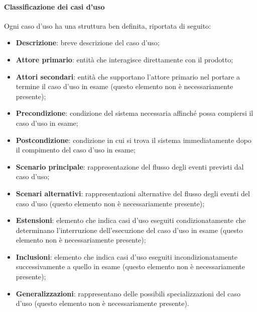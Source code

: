 \paragraph{Classificazione dei casi d'uso}
\label{par:classificazione_casi_duso}

Ogni caso d'uso ha una struttura ben definita, riportata di seguito:
\begin{itemize}
    \item \textbf{Descrizione}: breve descrizione del caso d'uso;
    \item \textbf{Attore primario}: entità che interagisce direttamente con il prodotto;
    \item \textbf{Attori secondari}: entità che supportano l'attore primario nel portare a termine il caso d'uso in 
    	esame (questo elemento non è necessariamente presente);
    \item \textbf{Precondizione}: condizione del sistema necessaria affinché possa compiersi il caso d'uso in esame;
    \item \textbf{Postcondizione}: condizione in cui si trova il sistema immediatamente dopo il compimento del caso 
    d'uso in esame;
    \item \textbf{Scenario principale}: rappresentazione del flusso degli eventi previsti dal caso d'uso;
    \item \textbf{Scenari alternativi}: rappresentazioni alternative del flusso degli eventi del caso d'uso (questo 
    	elemento non è necessariamente presente);
    \item \textbf{Estensioni}: elemento che indica casi d'uso eseguiti condizionatamente che determinano l'interruzione 
    	dell'esecuzione del caso d'uso in esame (questo elemento non è necessariamente presente);
    \item \textbf{Inclusioni}: elemento che indica casi d'uso eseguiti incondizionatamente successivamente a quello in 
    	esame (questo elemento non è necessariamente presente);
    \item \textbf{Generalizzazioni}: rappresentano delle possibili specializzazioni del caso d'uso (questo elemento non è necessariamente 
    	presente).
\end{itemize}

